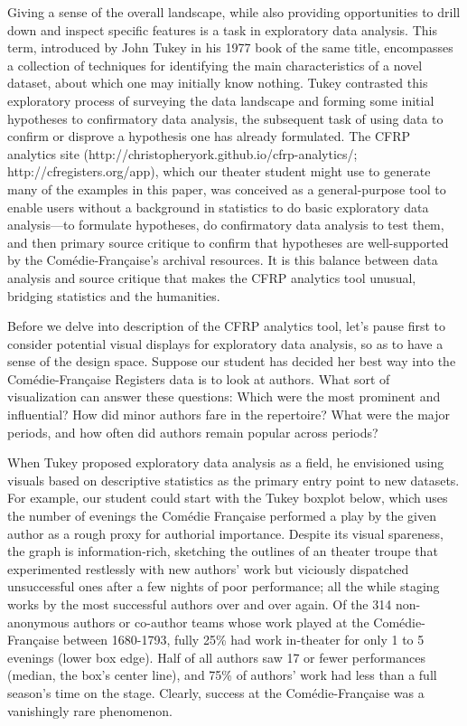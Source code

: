 \documentclass[	DIV=calc,%
							paper=a4,%
							fontsize=11pt,%
							twocolumn]{scrartcl}	 					%
\begin{document}
Giving a sense of the overall landscape, while also providing opportunities to drill down and inspect specific features is a task in exploratory data analysis. This term, introduced by John Tukey in his 1977 book of the same title, encompasses a collection of techniques for identifying the main characteristics of a novel dataset, about which one may initially know nothing.  Tukey contrasted this exploratory process of surveying the data landscape and forming some initial hypotheses to confirmatory data analysis, the subsequent task of using data to confirm or disprove a hypothesis one has already formulated.\cite{TUKEY:1977}  The CFRP analytics site (http://christopheryork.github.io/cfrp-analytics/; http://cfregisters.org/app), which our theater student might use to generate many of the examples in this paper, was conceived as a general-purpose tool to enable users without a background in statistics to do basic exploratory data analysis—to formulate hypotheses, do confirmatory data analysis to test them, and then primary source critique to confirm that hypotheses are well-supported by the Comédie-Française’s archival resources.  It is this balance between data analysis and source critique that makes the CFRP analytics tool unusual, bridging statistics and the humanities.

Before we delve into description of the CFRP analytics tool, let’s pause first to consider potential visual displays for exploratory data analysis, so as to have a sense of the design space. Suppose our student has decided her best way into the Comédie-Française Registers data is to look at authors.  What sort of visualization can answer these questions: Which were the most prominent and influential?  How did minor authors fare in the repertoire?  What were the major periods, and how often did authors remain popular across periods?

When Tukey proposed exploratory data analysis as a field, he envisioned using visuals based on descriptive statistics as the primary entry point to new datasets.  For example, our student could start with the Tukey boxplot below, which uses the number of evenings the Comédie Française performed a play by the given author as a rough proxy for authorial importance.  Despite its visual spareness, the graph is information-rich, sketching the outlines of an theater troupe that experimented restlessly with new authors’ work but viciously dispatched unsuccessful ones after a few nights of poor performance; all the while staging works by the most successful authors over and over again. Of the 314 non-anonymous authors or co-author teams whose work played at the Comédie-Française between 1680-1793, fully 25\% had work in-theater for only 1 to 5 evenings (lower box edge).  Half of all authors saw 17 or fewer performances (median, the box’s center line), and 75\% of authors’ work had less than a full season’s time on the stage.  Clearly, success at the Comédie-Française was a vanishingly rare phenomenon.
\end{document}
